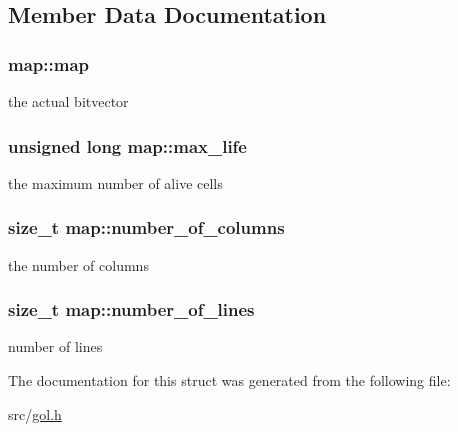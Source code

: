 \subsection{Member Data Documentation}
\hypertarget{structmap_ae9243fe2b84af47008bbca03f017e7a6}{
\subsubsection[{map}]{ map\+::map}}\label{structmap_ae9243fe2b84af47008bbca03f017e7a6}
the actual bitvector \hypertarget{structmap_a26a700b5989c45db406cf55f861b50c8}{
\subsubsection[{max\+\_\+life}]{\setlength{\rightskip}{0pt plus 5cm}unsigned long map\+::max\+\_\+life}}\label{structmap_a26a700b5989c45db406cf55f861b50c8}
the maximum number of alive cells \hypertarget{structmap_a1af4ea8f87e35c094fbc75ef821a4a16}{
\subsubsection[{number\+\_\+of\+\_\+columns}]{\setlength{\rightskip}{0pt plus 5cm}size\+\_\+t map\+::number\+\_\+of\+\_\+columns}}\label{structmap_a1af4ea8f87e35c094fbc75ef821a4a16}
the number of columns \hypertarget{structmap_a9dc72549424fad730c80918f48421c4c}{
\subsubsection[{number\+\_\+of\+\_\+lines}]{\setlength{\rightskip}{0pt plus 5cm}size\+\_\+t map\+::number\+\_\+of\+\_\+lines}}\label{structmap_a9dc72549424fad730c80918f48421c4c}
number of lines 

The documentation for this struct was generated from the following file\+:\begin{DoxyCompactItemize}
\item 
src/\hyperlink{gol_8h}{gol.\+h}\end{DoxyCompactItemize}
